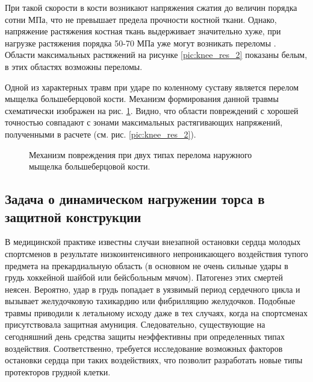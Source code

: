 \clearpage
\newpage

При такой скорости в кости возникают напряжения сжатия до величин порядка сотни МПа, что не превышает предела прочности костной ткани. Однако, напряжение растяжения костная ткань выдерживает значительно хуже, при нагрузке растяжения порядка 50-70 МПа уже могут возникать переломы \cite{begun}. Области максимальных растяжений на рисунке \ref{pic:knee_res_2} показаны белым, в этих областях возможны переломы.

Одной из характерных травм при ударе по коленному суставу является перелом мыщелка большеберцовой кости. Механизм формирования данной травмы схематически изображен на рис. \ref{pic:knee_crack_scheme}. Видно, что области повреждений с хорошей точностью совпадают с зонами максимальных растягивающих напряжений, полученными в расчете (см. рис. \ref{pic:knee_res_2}).

\begin{figure}[h]
\caption{Механизм повреждения при двух типах перелома наружного мыщелка большеберцовой кости.}
\label{pic:knee_crack_scheme}
\end{figure}


\clearpage
\newpage


\subsection{Задача о динамическом нагружении торса в защитной конструкции}

В медицинской практике известны случаи внезапной остановки сердца молодых спортсменов в результате низкоинтенсивного непроникающего воздействия тупого предмета на прекардиальную область (в основном не очень сильные удары в грудь хоккейной шайбой или бейсбольным мячом). Патогенез этих смертей неясен. Вероятно, удар в грудь попадает в уязвимый период сердечного цикла и вызывает желудочковую тахикардию или фибрилляцию желудочков. Подобные травмы приводили к летальному исходу даже в тех случаях, когда на спортсменах присутствовала защитная амуниция. Следовательно, существующие на сегодняшний день средства защиты неэффективны при определенных типах воздействия. Соответственно, требуется исследование возможных факторов остановки сердца при таких воздействиях, что позволит разработать новые типы протекторов грудной клетки.

